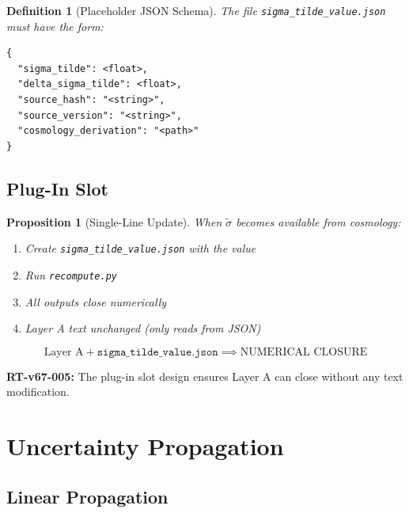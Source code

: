 \documentclass[11pt,letterpaper]{article}
\newtheorem{proposition}[theorem]{Proposition}
\newtheorem{definition}[theorem]{Definition}
\newcommand{\st}{\tilde{\sigma}}
\begin{document}
\begin{definition}[Placeholder JSON Schema]
\label{def:json-schema}
The file \texttt{sigma\_tilde\_value.json} must have the form:
\begin{verbatim}
{
  "sigma_tilde": <float>,
  "delta_sigma_tilde": <float>,
  "source_hash": "<string>",
  "source_version": "<string>",
  "cosmology_derivation": "<path>"
}
\end{verbatim}
\end{definition}

\subsection{Plug-In Slot}
\label{subsec:plug-in}

\begin{proposition}[Single-Line Update]
\label{prop:single-line}
When $\st$ becomes available from cosmology:
\begin{enumerate}[noitemsep]
\item Create \texttt{sigma\_tilde\_value.json} with the value
\item Run \texttt{recompute.py}
\item All outputs close numerically
\item Layer A text unchanged (only reads from JSON)
\end{enumerate}
\end{proposition}

\begin{equation}
\text{Layer A} + \texttt{sigma\_tilde\_value.json} \implies \text{NUMERICAL CLOSURE}
\label{eq:plug-in}
\end{equation}

\begin{reviewertrap}
\textbf{RT-v67-005:} The plug-in slot design ensures Layer A can close without any text modification.
\end{reviewertrap}

\section{Uncertainty Propagation}
\label{sec:uncertainty-prop}

\subsection{Linear Propagation}
\label{subsec:linear-prop}
\end{document}
